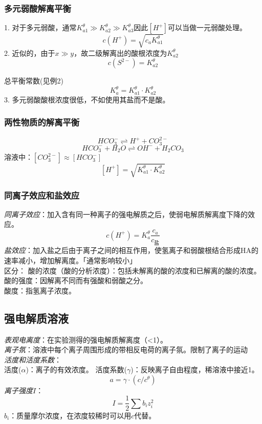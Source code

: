 \documentclass[utf8,a4paper,12pt]{ctexart}
\begin{document}
\subsubsection{多元弱酸解离平衡}
1. 对于多元弱酸，通常$K_{a1}^{\theta}\gg K_{a2}^{\theta}\gg K_{a3}^{\theta}$因此$[H^{+}]$可以当做一元弱酸处理。
\[
c(H^{+}) = \sqrt{c_{a}K_{a1}^{\theta}}
\]
2. 近似的，由于$x\gg y$，故二级解离出的酸根浓度为$K^{\theta}_{a2}$
\[
c(S^{2-}) = K_{a2}^{\theta}
\]

总平衡常数(见例2)
\[
K_{a}^{\theta} = K_{a1}^{\theta}\cdot K_{a2}^{\theta}
\]
3. 多元弱酸酸根浓度很低，不如使用其盐而不是酸。


\subsubsection{两性物质的解离平衡}
\[
HCO_{3}^{-} \rightleftharpoons H^{+}+CO_{3}^{2-}
\]
\[
HCO_{3}^{-} + H_{2}O \rightleftharpoons OH^{-} + H_{2}CO_{3}
\]
溶液中：$[CO_{3}^{2-}] \approx [HCO_{3}^{-}]$
\[
[H^{+}] = \sqrt{K_{a1}^{\theta}\cdot K_{a2}^{\theta}}
\]
\subsubsection{同离子效应和盐效应}
\emph{同离子效应}：加入含有同一种离子的强电解质之后，使弱电解质解离度下降的效应。\\
\begin{equation}
c(H^{+}) = K_{a}^{\theta}\frac{c_{a}}{c_{\text{盐}}}
\end{equation}
\emph{盐效应}：加入盐之后由于离子之间的相互作用，使氢离子和弱酸根结合形成HA的速率减小，增加解离度。「通常影响较小」\\
区分：
\quad 酸的浓度（酸的分析浓度）：包括未解离的酸的浓度和已解离的酸的浓度。\\
\quad 酸的强度：因解离不同而有强酸和弱酸之分。\\
\quad 酸度：指氢离子浓度。\\
\subsection{强电解质溶液}
\emph{表观电离度}：在实验测得的强电解质解离度（<1）。\\
\emph{离子氛}：溶液中每个离子周围形成的带相反电荷的离子氛。限制了离子的运动\\
\emph{活度和活度系数}：\\
活度($\alpha$)：离子的有效浓度。
活度系数($\gamma$)：反映离子自由程度，稀溶液中接近1。
\begin{equation}
a = \gamma \cdot (c/c^{\theta})
\end{equation}
\emph{离子强度$I$}：
\begin{equation}
I = {\displaystyle\frac{1}{2}\sum b_{i}z_{i}^{2}}
\end{equation}
$b_{i}$：质量摩尔浓度，在浓度较稀时可以用$c$代替。\\
\end{document}
